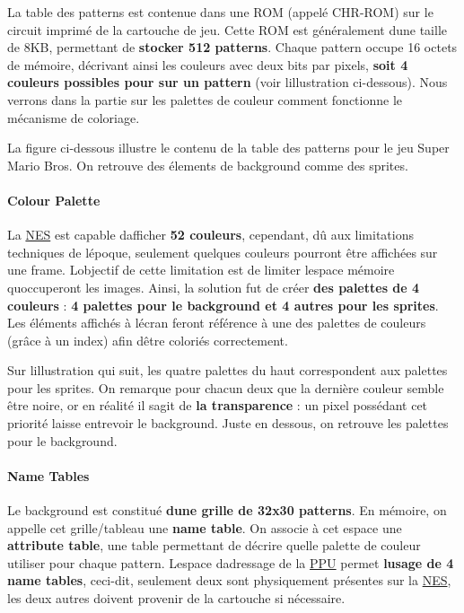 La table des patterns est contenue dans une R\+OM (appelé C\+H\+R-\/\+R\+OM) sur le circuit imprimé de la cartouche de jeu. Cette R\+OM est généralement d\textquotesingle{}une taille de 8\+KB, permettant de {\bfseries stocker 512 patterns}. Chaque pattern occupe 16 octets de mémoire, décrivant ainsi les couleurs avec deux bits par pixels, {\bfseries soit 4 couleurs possibles pour sur un pattern} (voir l\textquotesingle{}illustration ci-\/dessous). Nous verrons dans la partie sur les palettes de couleur comment fonctionne le mécanisme de coloriage.



La figure ci-\/dessous illustre le contenu de la table des patterns pour le jeu Super Mario Bros. On retrouve des élements de background comme des sprites.



\paragraph*{Colour Palette}

La \hyperlink{struct_n_e_s}{N\+ES} est capable d\textquotesingle{}afficher {\bfseries 52 couleurs}, cependant, dû aux limitations techniques de l\textquotesingle{}époque, seulement quelques couleurs pourront être affichées sur une frame. L\textquotesingle{}objectif de cette limitation est de limiter l\textquotesingle{}espace mémoire qu\textquotesingle{}occuperont les images. Ainsi, la solution fut de créer {\bfseries des palettes de 4 couleurs} \+: {\bfseries 4 palettes pour le background et 4 autres pour les sprites}. Les éléments affichés à l\textquotesingle{}écran feront référence à une des palettes de couleurs (grâce à un index) afin d\textquotesingle{}être coloriés correctement.

Sur l\textquotesingle{}illustration qui suit, les quatre palettes du haut correspondent aux palettes pour les sprites. On remarque pour chacun d\textquotesingle{}eux que la dernière couleur semble être noire, or en réalité il s\textquotesingle{}agit de {\bfseries la transparence} \+: un pixel possédant cet priorité laisse entrevoir le background. Juste en dessous, on retrouve les palettes pour le background.



\paragraph*{Name Tables}

Le background est constitué {\bfseries d\textquotesingle{}une grille de 32x30 patterns}. En mémoire, on appelle cet grille/tableau une {\bfseries name table}. On associe à cet espace une {\bfseries attribute table}, une table permettant de décrire quelle palette de couleur utiliser pour chaque pattern. L\textquotesingle{}espace d\textquotesingle{}adressage de la \hyperlink{struct_p_p_u}{P\+PU} permet {\bfseries l\textquotesingle{}usage de 4 name tables}, ceci-\/dit, seulement deux sont physiquement présentes sur la \hyperlink{struct_n_e_s}{N\+ES}, les deux autres doivent provenir de la cartouche si nécessaire.

